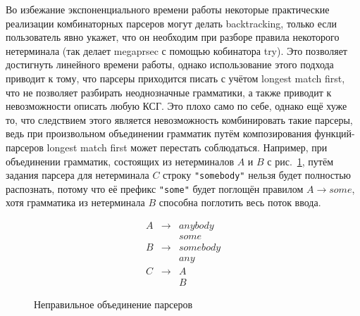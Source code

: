 \documentclass[times]{itmo-student-thesis}
\begin{document}
Во избежание экспоненциального времени работы некоторые практические реализации комбинаторных парсеров могут делать
backtracking, только если пользователь явно укажет, что он необходим при разборе правила некоторого нетерминала (так
делает megaprsec\cite{megaparsec} с помощью кобинатора try). Это позволяет достигнуть линейного времени работы,
однако использование этого подхода приводит к тому, что парсеры приходится писать с учётом longest match first, что не
позволяет разбирать неоднозначные грамматики, а также приводит к невозможности описать любую КСГ. Это плохо само по
себе, однако ещё хуже то, что следствием этого является невозможность комбинировать такие парсеры, ведь при
произвольном объединении грамматик путём композирования функций-парсеров longest match first может перестать
соблюдаться. Например, при объединении грамматик, состоящих из нетерминалов $A$ и
$B$ с рис.~\ref{uncomposable_grammar}, путём задания парсера для нетерминала $C$ строку
\lstinline|"somebody"| нельзя будет полностью распознать, потому что её префикс \lstinline|"some"| будет поглощён правилом
$A \to some$, хотя грамматика из нетерминала $B$ способна поглотить весь поток ввода.

\begin{figure}[!h]
    \caption{Неправильное объединение парсеров}\label{uncomposable_grammar}
    \[
        \begin{array}{lll}
            A & \to & anybody \\
              &     & some  \\
            B & \to & somebody \\
              &     & any  \\
            C & \to & A  \\
              &     & B
        \end{array}
    \]
\end{figure}
\end{document}

